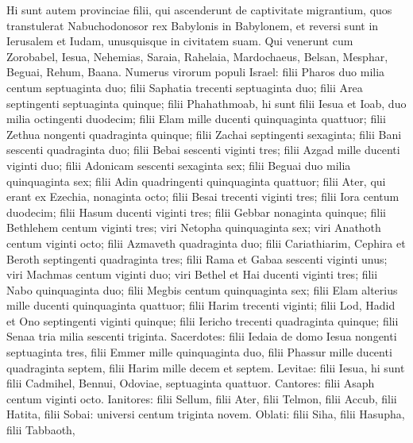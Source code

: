 \begin{biblechapter}
\begin{biblechapter}
\verse Hi sunt autem provinciae filii, qui ascenderunt de captivitate migrantium, quos transtulerat Nabuchodonosor rex Babylonis in Babylonem, et reversi sunt in Ierusalem et Iudam, unusquisque in civitatem suam. 
\verse Qui venerunt cum Zorobabel, Iesua, Nehemias, Saraia, Rahelaia, Mardochaeus, Belsan, Mesphar, Beguai, Rehum, Baana.
 Numerus virorum populi Israel: 
\verse filii Pharos duo milia centum septuaginta duo; 
\verse filii Saphatia trecenti septuaginta duo; \verse filii Area septingenti septuaginta quinque; 
\verse filii Phahathmoab, hi sunt filii Iesua et Ioab, duo milia octingenti duodecim; 
\verse filii Elam mille ducenti quinquaginta quattuor; 
 \verse filii Zethua nongenti quadraginta quinque; 
\verse filii Zachai septingenti sexaginta; 
\verse filii Bani sescenti quadraginta duo; 
\verse filii Bebai sescenti viginti tres; 
\verse filii Azgad mille ducenti viginti duo; 
\verse filii Adonicam sescenti sexaginta sex; 
\verse filii Beguai duo milia quinquaginta sex; 
\verse filii Adin quadringenti quinquaginta quattuor; 
\verse filii Ater, qui erant ex Ezechia, nonaginta octo; 
\verse filii Besai trecenti viginti tres; 
\verse filii Iora centum duodecim; 
\verse filii Hasum ducenti viginti tres; 
\verse filii Gebbar nonaginta quinque; 
\verse filii Bethlehem centum viginti tres; 
\verse viri Netopha quinquaginta sex; 
\verse viri Anathoth centum viginti octo; 
\verse filii Azmaveth quadraginta duo; 
\verse filii Cariathiarim, Cephira et Beroth septingenti quadraginta tres; 
\verse filii Rama et Gabaa sescenti viginti unus; 
\verse viri Machmas centum viginti duo; 
\verse viri Bethel et Hai ducenti viginti tres; 
\verse filii Nabo quinquaginta duo; 
 \verse filii Megbis centum quinquaginta sex; 
\verse filii Elam alterius mille ducenti quinquaginta quattuor; 
\verse filii Harim trecenti viginti; 
\verse filii Lod, Hadid et Ono septingenti viginti quinque; 
\verse filii Iericho trecenti quadraginta quinque; 
\verse filii Senaa tria milia sescenti triginta.
 \verse Sacerdotes: filii Iedaia de domo Iesua nongenti septuaginta tres, 
\verse filii Emmer mille quinquaginta duo, 
\verse filii Phassur mille ducenti quadraginta septem, 
\verse filii Harim mille decem et septem.
 \verse Levitae: filii Iesua, hi sunt filii Cadmihel, Bennui, Odoviae, septuaginta quattuor. 
\verse Cantores: filii Asaph centum viginti octo.
 \verse Ianitores: filii Sellum, filii Ater, filii Telmon, filii Accub, filii Hatita, filii Sobai: universi centum triginta novem.
 \verse Oblati: filii Siha, filii Hasupha, filii Tabbaoth, 

\end{biblechapter}
\end{biblechapter}

